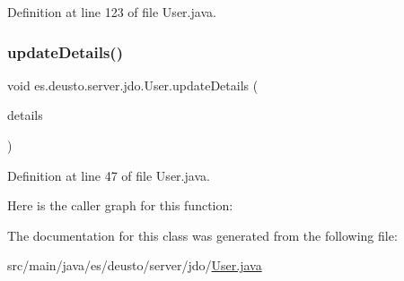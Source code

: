 Definition at line 123 of file User.\+java.

\mbox{\label{classes_1_1deusto_1_1server_1_1jdo_1_1_user_a2abb7df132d0ded1f4187d900416d65d}} 
\subsubsection{\texorpdfstring{updateDetails()}{updateDetails()}}
{\footnotesize\ttfamily void es.\+deusto.\+server.\+jdo.\+User.\+update\+Details (\begin{DoxyParamCaption}\item[{\mbox{\hyperlink{classes_1_1deusto_1_1server_1_1data_1_1_user_details_d_t_o}{User\+Details\+D\+TO}}}]{details }\end{DoxyParamCaption})}



Definition at line 47 of file User.\+java.

Here is the caller graph for this function\+:


The documentation for this class was generated from the following file\+:\begin{DoxyCompactItemize}
\item 
src/main/java/es/deusto/server/jdo/\mbox{\hyperlink{_user_8java}{User.\+java}}\end{DoxyCompactItemize}
